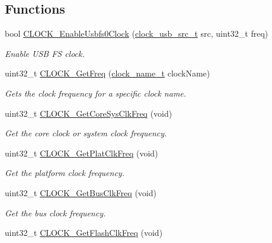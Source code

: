 \subsection*{Functions}
\begin{DoxyCompactItemize}
\item 
bool \mbox{\hyperlink{group__clock_ga2539fd76663a0ae15aec84b23489a070}{C\+L\+O\+C\+K\+\_\+\+Enable\+Usbfs0\+Clock}} (\mbox{\hyperlink{group__clock_ga014128d824509a661c917ed0ed21149f}{clock\+\_\+usb\+\_\+src\+\_\+t}} src, uint32\+\_\+t freq)
\begin{DoxyCompactList}\small\item\em Enable U\+SB FS clock. \end{DoxyCompactList}\item 
uint32\+\_\+t \mbox{\hyperlink{group__clock_ga53acae220d651789bb505c53c73ecf2b}{C\+L\+O\+C\+K\+\_\+\+Get\+Freq}} (\mbox{\hyperlink{group__clock_gacb9ec0a8b3aa569692b550ebdcac7b3c}{clock\+\_\+name\+\_\+t}} clock\+Name)
\begin{DoxyCompactList}\small\item\em Gets the clock frequency for a specific clock name. \end{DoxyCompactList}\item 
uint32\+\_\+t \mbox{\hyperlink{group__clock_ga3360f4c91fde2fed784359caf34aefd2}{C\+L\+O\+C\+K\+\_\+\+Get\+Core\+Sys\+Clk\+Freq}} (void)
\begin{DoxyCompactList}\small\item\em Get the core clock or system clock frequency. \end{DoxyCompactList}\item 
uint32\+\_\+t \mbox{\hyperlink{group__clock_gad6813b4059e476de162947021939d8dc}{C\+L\+O\+C\+K\+\_\+\+Get\+Plat\+Clk\+Freq}} (void)
\begin{DoxyCompactList}\small\item\em Get the platform clock frequency. \end{DoxyCompactList}\item 
uint32\+\_\+t \mbox{\hyperlink{group__clock_ga9da592c7723873abbfa51a62cbbff03d}{C\+L\+O\+C\+K\+\_\+\+Get\+Bus\+Clk\+Freq}} (void)
\begin{DoxyCompactList}\small\item\em Get the bus clock frequency. \end{DoxyCompactList}\item 
uint32\+\_\+t \mbox{\hyperlink{group__clock_gaa64c5e2ea6e2be57582e9868b67ce7ee}{C\+L\+O\+C\+K\+\_\+\+Get\+Flash\+Clk\+Freq}} (void)

\end{DoxyCompactItemize}

